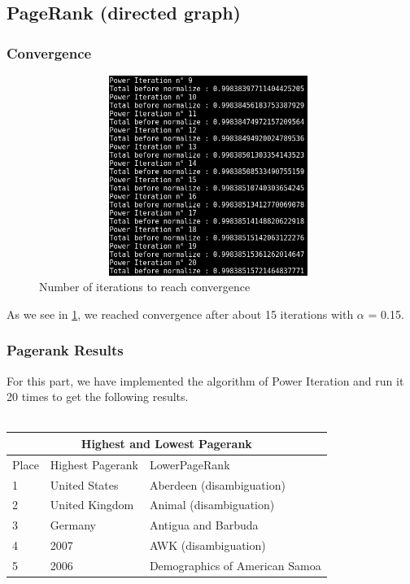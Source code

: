 \documentclass{article}
\begin{document}
\subsection{PageRank (directed graph)}
\subsubsection{Convergence}
\begin{figure}[h!]
\includegraphics[width=11cm, height=6.5cm]{powerIter.png}
 
  \caption{ \label{fig:iterations} Number of iterations to reach convergence}
\end{figure}
\FloatBarrier

As we see in \cref{fig:iterations}, we reached convergence after about 15 iterations with $\alpha$ = 0.15.
\subsubsection{Pagerank Results}
For this part, we have implemented the algorithm of Power Iteration and run it 20 times to get the following results.\\ \\
\begin{tabular}{ |p{1cm}||p{4.5cm}|p{5.5cm}|  }
 \hline
 \multicolumn{3}{|c|}{ Highest and Lowest Pagerank } \\
 \hline
 Place & Highest Pagerank & LowerPageRank\\
 \hline
 1 & United States & Aberdeen (disambiguation) \\
 2 & United Kingdom  &  Animal (disambiguation) \\
 3 & Germany & Antigua and Barbuda \\
 4 & 2007 & AWK (disambiguation) \\
 5 & 2006 & Demographics of American Samoa \\
 \hline
\end{tabular}
\end{document}
